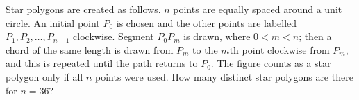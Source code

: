 Star polygons are created as follows. $n$ points are equally spaced around a unit circle. An initial point $P_0$ is chosen and the other points are labelled $P_1,P_2,\dots,P_{n-1}$ clockwise. Segment $P_0P_m$ is drawn, where $0<m<n$; then a chord of the same length is drawn from $P_m$ to the $m$th point clockwise from $P_m$, and this is repeated until the path returns to $P_0$. The figure counts as a star polygon only if all $n$ points were used. How many distinct star polygons are there for $n=36$?
